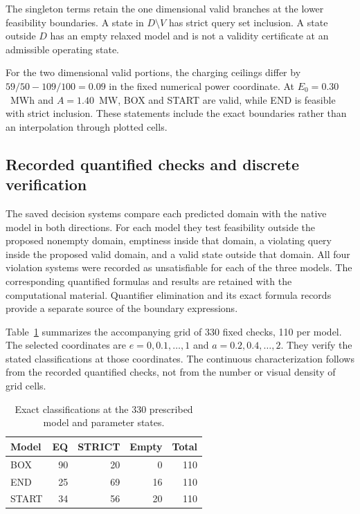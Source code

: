 The singleton terms retain the one dimensional valid branches at the lower
feasibility boundaries. A state in $D\setminus V$ has strict query set
inclusion. A state outside $D$ has an empty relaxed model and is not a
validity certificate at an admissible operating state.

For the two dimensional valid portions, the charging ceilings differ by
$59/50-109/100=0.09$ in the fixed numerical power coordinate.
At $E_0=0.30$~MWh and $A=1.40$~MW, BOX and START are valid, while
END is feasible with strict inclusion. These statements include the exact
boundaries rather than an interpolation through plotted cells.

\subsection{Recorded quantified checks and discrete verification}
The saved decision systems compare each predicted domain with the native
model in both directions. For each model they test feasibility outside the
proposed nonempty domain, emptiness inside that domain, a violating query
inside the proposed valid domain, and a valid state outside that domain.
All four violation systems were recorded as unsatisfiable for each of the
three models. The corresponding quantified formulas and results are
retained with the computational material. Quantifier elimination and its
exact formula records provide a separate source of the boundary expressions.

Table~\ref{tab:boundary_grid} summarizes the accompanying grid of 330 fixed checks, 110 per model. The
selected coordinates are $e=0,0.1,\ldots,1$ and
$a=0.2,0.4,\ldots,2$. They verify the stated classifications at those
coordinates. The continuous characterization follows from the recorded
quantified checks, not from the number or visual density of grid cells.


\begin{table}[htbp]
\caption{Exact classifications at the 330 prescribed model and parameter states.}
\label{tab:boundary_grid}
\begin{tabular}{@{}lrrrr@{}}\toprule
Model & EQ & STRICT & Empty & Total\\\midrule
BOX &90&20&0&110\\
END &25&69&16&110\\
START &34&56&20&110\\
\bottomrule\end{tabular}
\end{table}


